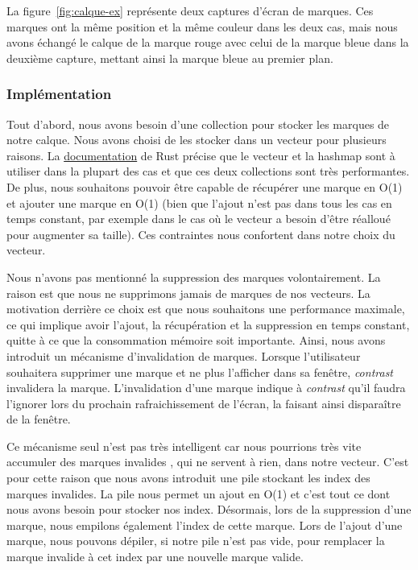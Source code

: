 \documentclass[12pt]{article}
\begin{document}
La figure~\ref{fig:calque-ex} représente deux captures d'écran de marques.
Ces marques ont la même position et la même couleur dans les deux cas, mais nous avons échangé le calque 
de la marque rouge avec celui de la marque bleue dans la deuxième capture, mettant ainsi la marque bleue
au premier plan.

\subsubsection{Implémentation}

Tout d'abord, nous avons besoin d'une collection pour stocker les marques de notre calque.
Nous avons choisi de les stocker dans un vecteur pour plusieurs raisons.
La \href{https://doc.rust-lang.org/std/collections/index.html}{documentation} de Rust précise que le
vecteur et la hashmap sont à utiliser dans la plupart des cas et que ces deux collections sont très
performantes.
De plus, nous souhaitons pouvoir être capable de récupérer une marque en O(1) et ajouter une marque en
O(1) (bien que l'ajout n'est pas dans tous les cas en temps constant, par exemple dans le cas où le 
vecteur a besoin d'être réalloué pour augmenter sa taille). Ces contraintes nous confortent dans notre 
choix du vecteur.

Nous n'avons pas mentionné la suppression des marques volontairement. La raison est que nous ne supprimons
jamais de marques de nos vecteurs. La motivation derrière ce choix est que nous souhaitons une performance
maximale, ce qui implique avoir l'ajout, la récupération et la suppression en temps constant, quitte à
ce que la consommation mémoire soit importante.
Ainsi, nous avons introduit un mécanisme d'invalidation de marques. Lorsque l'utilisateur souhaitera
supprimer une marque et ne plus l'afficher dans sa fenêtre, \textit{contrast} invalidera la marque.
L'invalidation d'une marque indique à \textit{contrast} qu'il faudra l'ignorer lors du prochain
rafraichissement de l'écran, la faisant ainsi disparaître de la fenêtre.

Ce mécanisme seul n'est pas très intelligent car nous pourrions très vite accumuler des marques invalides
, qui ne servent à rien, dans notre vecteur.
C'est pour cette raison que nous avons introduit une pile stockant les index des marques invalides.
La pile nous permet un ajout en O(1) et c'est tout ce dont nous avons besoin pour stocker nos index.
Désormais, lors de la suppression d'une marque, nous empilons également l'index de cette marque.
Lors de l'ajout d'une marque, nous pouvons dépiler, si notre pile n'est pas vide, pour remplacer la
marque invalide à cet index par une nouvelle marque valide.
\end{document}
